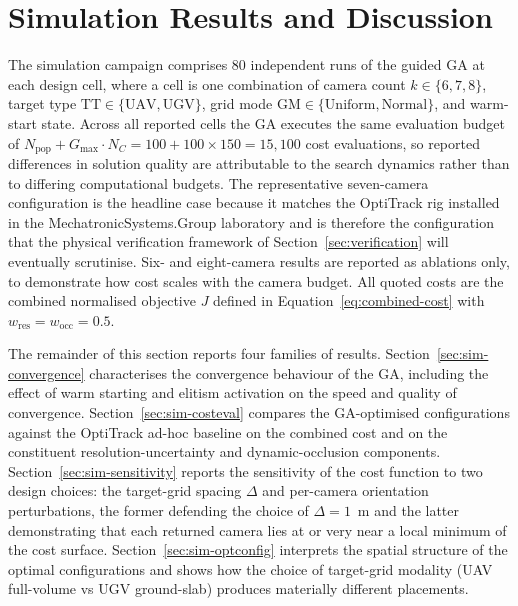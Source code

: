 
\section{Simulation Results and Discussion}
\label{sec: sim_results}
The simulation campaign comprises $80$ independent runs of the guided GA at each design cell, where a cell is one combination of camera count $k\in\{6,7,8\}$, target type $\mathrm{TT}\in\{\text{UAV},\text{UGV}\}$, grid mode $\mathrm{GM}\in\{\text{Uniform},\text{Normal}\}$, and warm-start state. Across all reported cells the GA executes the same evaluation budget of $N_{\mathrm{pop}}+G_{\max}\!\cdot\!N_C = 100 + 100\!\times\!150 = 15{,}100$ cost evaluations, so reported differences in solution quality are attributable to the search dynamics rather than to differing computational budgets. The representative seven-camera configuration is the headline case because it matches the OptiTrack rig installed in the MechatronicSystems.Group laboratory and is therefore the configuration that the physical verification framework of Section~\ref{sec:verification} will eventually scrutinise. Six- and eight-camera results are reported as ablations only, to demonstrate how cost scales with the camera budget. All quoted costs are the combined normalised objective $J$ defined in Equation~\eqref{eq:combined-cost} with $w_{\mathrm{res}}=w_{\mathrm{occ}}=0.5$.

The remainder of this section reports four families of results. Section~\ref{sec:sim-convergence} characterises the convergence behaviour of the GA, including the effect of warm starting and elitism activation on the speed and quality of convergence. Section~\ref{sec:sim-costeval} compares the GA-optimised configurations against the OptiTrack ad-hoc baseline on the combined cost and on the constituent resolution-uncertainty and dynamic-occlusion components. Section~\ref{sec:sim-sensitivity} reports the sensitivity of the cost function to two design choices: the target-grid spacing $\Delta$ and per-camera orientation perturbations, the former defending the choice of $\Delta=1$~m and the latter demonstrating that each returned camera lies at or very near a local minimum of the cost surface. Section~\ref{sec:sim-optconfig} interprets the spatial structure of the optimal configurations and shows how the choice of target-grid modality (UAV full-volume vs UGV ground-slab) produces materially different placements.


